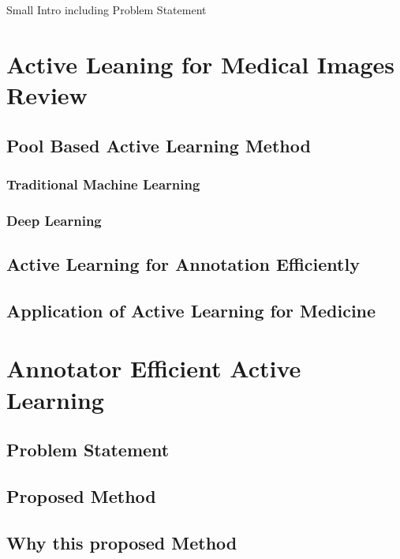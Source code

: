Small Intro including Problem Statement

\section{Active Leaning for Medical Images Review}

\subsection{Pool Based Active Learning Method}

\subsubsection{Traditional Machine Learning}

\subsubsection{Deep Learning}

\subsection{Active Learning for Annotation Efficiently}

\subsection{Application of Active Learning for Medicine}



\section{Annotator Efficient Active Learning}

\subsection{Problem Statement}

\subsection{Proposed Method}

\subsection{Why this proposed Method}



